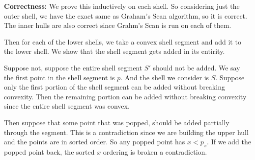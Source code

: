 \documentclass[11pt]{article}
\begin{document}
\textbf{Correctness:} We prove this inductively on each shell. So considering just the outer shell,
we have the exact same as Graham's Scan algorithm, so it is correct. 
The inner hulls are also correct since Grahm's Scan is run on each of them.  

Then for each of the lower shells, we take a convex shell segment and add it to the lower shell. 
We show that the shell segment gets added in its entirity.

Suppose not, suppose the entire shell segment $S'$ should not be added. We say the first point in the shell segment is $p$.
And the shell we consider is $S$. Suppose only the first portion of the shell segment can be added without breaking convexity.
Then the remaining portion can be added without breaking convexity since the entire shell segment was convex. 

Then suppose that some point that was popped, should be added partially through the segment. 
This is a contradiction since we are building the upper hull and the points are in sorted order. So any popped point has
$x < p_x$. If we add the popped point back, the sorted $x$ ordering is broken a contradiction.
\end{document}

